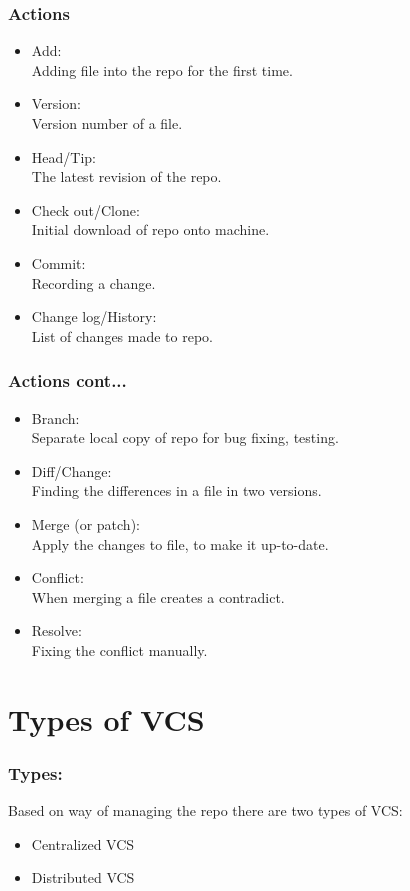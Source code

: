 \documentclass[14pt,compress]{beamer}
\newcounter{time}
\begin{document}
\begin{frame}
  \frametitle{Actions}
  \begin{itemize}
  \item Add:\\
    Adding file into the repo for the first time.
  \item Version:\\
    Version number of a file.
  \item Head/Tip:\\
    The latest revision of the repo.
  \item Check out/Clone:\\
    Initial download of repo onto machine.
  \item Commit:\\
    Recording a change.
  \item Change log/History:\\
    List of changes made to repo.
  \end{itemize}
\end{frame}

\begin{frame}
  \frametitle{Actions cont...}
  \begin{itemize}
  \item Branch:\\
    Separate local copy of repo for bug fixing, testing.
  \item Diff/Change:\\
    Finding the differences in a file in two versions.
  \item Merge (or patch):\\
    Apply the changes to file, to make it up-to-date.
  \item Conflict:\\
    When merging a file creates a contradict.
  \item Resolve:\\
    Fixing the conflict manually.
  \end{itemize}
\end{frame}

\section{Types of VCS}

\begin{frame}
  \frametitle{Types:}
  Based on way of managing the repo there are two types of VCS:
  \begin{itemize}
  \item Centralized VCS
  \item Distributed VCS
  \end{itemize}
\end{frame}
\end{document}

